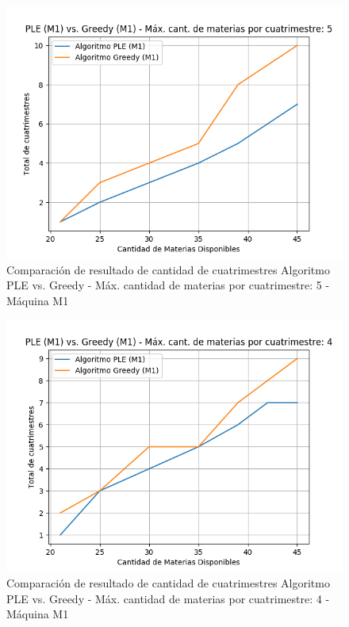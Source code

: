 \documentclass[a4paper]{article}
\begin{document}
\begin{figure}[H]
\centering
\includegraphics[scale=0.65]{Imagenes/m1_PLE_vs_GREEDY_total_cuatrimestres_max_mat_5.png}\par
\caption{Comparación de resultado de cantidad de cuatrimestres Algoritmo PLE vs. Greedy - Máx. cantidad de materias por cuatrimestre: 5 - Máquina M1}
\end{figure}

\begin{figure}[H]
\centering
\includegraphics[scale=0.65]{Imagenes/m1_PLE_vs_GREEDY_total_cuatrimestres_max_mat_4.png}\par
\caption{Comparación de resultado de cantidad de cuatrimestres Algoritmo PLE vs. Greedy - Máx. cantidad de materias por cuatrimestre: 4 - Máquina M1}
\end{figure}
\end{document}

